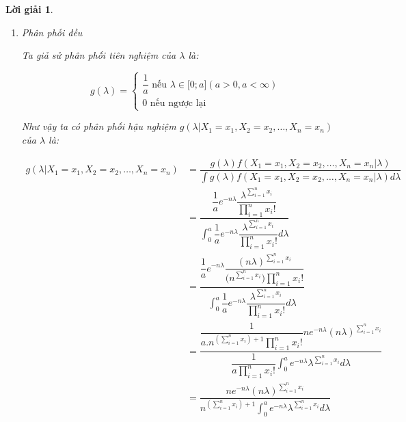 \documentclass[14pt, a4paper]{article}
\theoremstyle{sltheorem}
\theoremstyle{soltheorem}
\newtheorem*{loigiai}{Lời giải}
\begin{document}
\begin{loigiai}
\begin{enumerate}
        \begin{enumerate}[label=(\alph*)]
            \item Phân phối đều
            
            Ta giả sử phân phối tiên nghiệm của $\lambda$ là:

            \begin{equation*}
                g(\lambda) = \begin{cases}
                    \dfrac{1}{a} \text{ nếu } \lambda \in \lbrack 0; a\rbrack (a > 0, a < \infty) \\
                    0 \text{ nếu ngược lại}
                \end{cases}
            \end{equation*}

            Như vậy ta có phân phối hậu nghiệm $g(\lambda \vert X_1 =x_1, X_2=x_2, \dots, X_n=x_n)$ của $\lambda$ là:

            \begin{equation*}
                \begin{aligned}
                    g(\lambda \vert X_1 =x_1, X_2=x_2, \dots, X_n=x_n) &= \dfrac{g(\lambda) f(X_1=x_1,X_2=x_2,\dots, X_n=x_n \vert \lambda)}{\int g(\lambda) f(X_1=x_1,X_2=x_2,\dots, X_n=x_n \vert \lambda) d \lambda} \\
                    &= \dfrac{\dfrac{1}{a} e^{-n\lambda} \dfrac{\lambda^{\sum_{i=1}^n x_i}}{\prod_{i=1}^n x_i!}}{\displaystyle\int_{0}^{a} \dfrac{1}{a} e^{-n\lambda} \dfrac{\lambda^{\sum_{i=1}^n x_i}}{\prod_{i=1}^n x_i!} d \lambda} \\
                    &= \dfrac{\dfrac{1}{a} e^{-n \lambda} \dfrac{(n\lambda)^{\sum_{i=1}^n x_i}}{\big(n^{\sum_{i=1}^n x_i}\big)\prod_{i=1}^n x_i!}}{\displaystyle\int_{0}^{a} \dfrac{1}{a} e^{-n\lambda} \dfrac{\lambda^{\sum_{i=1}^n x_i}}{\prod_{i=1}^n x_i!} d \lambda} \\
                    &= \dfrac{\dfrac{1}{a. n^{(\sum_{i=1}^n x_i) + 1}\prod_{i=1}^n x_i !}  ne^{-n\lambda} (n\lambda)^{\sum_{i=1}^n x_i}}{\dfrac{1}{a \prod_{i=1}^n x_i!} \displaystyle \int_{0}^a e^{-n\lambda}\lambda^{\sum_{i=1}^n x_i}d\lambda} \\
                    &= \dfrac{n e^{-n\lambda}(n\lambda)^{\sum_{i=1}^n x_i}}{n^{(\sum_{i=1}^n x_i) + 1}\displaystyle\int_{0}^a e^{-n\lambda} \lambda^{\sum_{i=1}^n x_i}d\lambda}
                \end{aligned}
            \end{equation*}


\end{enumerate}
\end{enumerate}
\end{loigiai}
\end{document}
